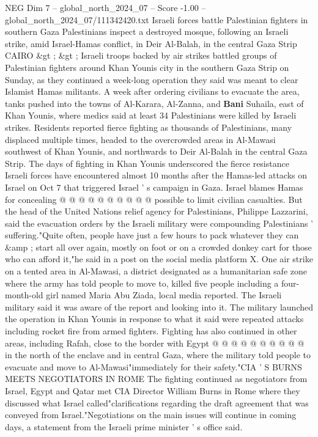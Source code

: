 \begin{textsample}{NEG Dim 7 – global\_north\_2024\_07 – Score -1.00 – global\_north\_2024\_07/111342420.txt}  \label{ex:f7_neg_411}
Israeli forces battle Palestinian fighters in southern Gaza Palestinians inspect a destroyed mosque, following an Israeli strike, amid Israel-Hamas conflict, in Deir Al-Balah, in the central Gaza Strip CAIRO \&gt ; \&gt ; Israeli troops backed by air strikes battled groups of Palestinian fighters around Khan Younis city in the southern Gaza Strip on Sunday, as they continued a week-long operation they said was meant to clear Islamist Hamas militants.
A week after ordering civilians to evacuate the area, tanks pushed into the towns of Al-Karara, Al-Zanna, and \textbf{Bani} Suhaila, east of Khan Younis, where medics said at least 34 Palestinians were killed by Israeli strikes.
Residents reported fierce fighting as thousands of Palestinians, many displaced multiple times, headed to the overcrowded areas in Al-Mawasi southwest of Khan Younis, and northwards to Deir Al-Balah in the central Gaza Strip.
The days of fighting in Khan Younis underscored the fierce resistance Israeli forces have encountered almost 10 months after the Hamas-led attacks on Israel on Oct 7 that triggered Israel ' s campaign in Gaza.
Israel blames Hamas for concealing @ @ @ @ @ @ @ @ @ @ possible to limit civilian casualties.
But the head of the United Nations relief agency for Palestinians, Philippe Lazzarini, said the evacuation orders by the Israeli military were compounding Palestinians ' suffering."Quite often, people have just a few hours to pack whatever they can \&amp ; start all over again, mostly on foot or on a crowded donkey cart for those who can afford it,"he said in a post on the social media platform X.
One air strike on a tented area in Al-Mawasi, a district designated as a humanitarian safe zone where the army has told people to move to, killed five people including a four-month-old girl named Maria Abu Ziada, local media reported.
The Israeli military said it was aware of the report and looking into it.
The military launched the operation in Khan Younis in response to what it said were repeated attacks including rocket fire from armed fighters.
Fighting has also continued in other areas, including Rafah, close to the border with Egypt @ @ @ @ @ @ @ @ @ @ in the north of the enclave and in central Gaza, where the military told people to evacuate and move to Al-Mawasi"immediately for their safety."CIA ' S BURNS MEETS NEGOTIATORS IN ROME The fighting continued as negotiators from Israel, Egypt and Qatar met CIA Director William Burns in Rome where they discussed what Israel called"clarifications regarding the draft agreement that was conveyed from Israel."Negotiations on the main issues will continue in coming days, a statement from the Israeli prime minister ' s office said.

\end{textsample}
